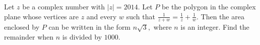 Let $z$ be a complex number with $|z| = 2014$. Let $P$ be the polygon in the complex plane whose vertices are $z$ and every $w$ such that $\tfrac{1}{z+w} = \tfrac{1}{z} + \tfrac{1}{w}$. Then the area enclosed by $P$ can be written in the form $n\sqrt{3},$ where $n$ is an integer. Find the remainder when $n$ is divided by $1000$.